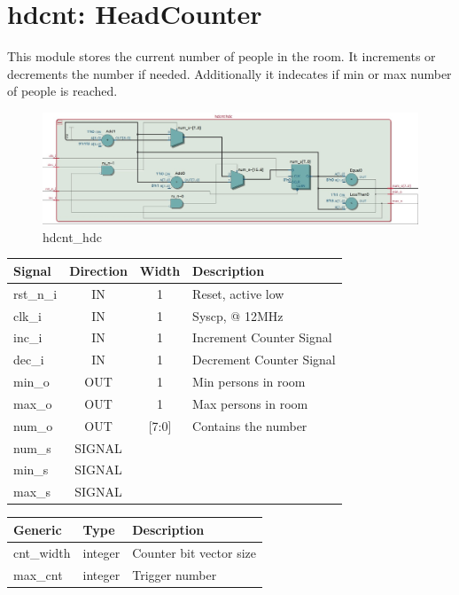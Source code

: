 \documentclass[12pt,a4 paper] {report}
\begin{document}
\newpage

\section{hdcnt: HeadCounter}
This module stores the current number of people in the room. It increments or decrements the number if needed. 
Additionally it indecates if min or max number of people is reached.
\begin{figure}[h]
	\centering	
	\includegraphics[scale=0.3]{../png/hdcnt_hdc.png}
	\caption{hdcnt\_hdc}
\end{figure}
\begin{center}
	\begin{tabular}{ | p{2cm} | c | c | p{5cm} |}
		\hline
		\textbf{Signal} & \textbf{Direction} & \textbf{Width} & \textbf{Description} \\
		\hline	
		rst\_n\_i & IN & 1 & Reset, active low \\
		\hline
		clk\_i & IN & 1 & Syscp, @ 12MHz \\
		\hline
		inc\_i & IN & 1 & Increment Counter Signal \\
		\hline
		dec\_i & IN & 1 & Decrement Counter Signal \\
		\hline
		min\_o & OUT & 1 & Min persons in room \\
		\hline
		max\_o & OUT & 1 & Max persons in room \\
		\hline
		num\_o & OUT & [7:0] & Contains the number \\
		\hline
		\hline
		num\_s & SIGNAL & & \\
		\hline
		min\_s & SIGNAL & & \\
		\hline
		max\_s & SIGNAL & & \\
		\hline
	\end{tabular}
\end{center}
\begin{center}
	\begin{tabular}{| p{2cm} | p{2cm} | p{4cm} |}
		\hline
		\textbf{Generic} & \textbf{Type} & \textbf{Description} \\
		\hline
		cnt\_width & integer & Counter bit vector size  \\
		\hline
		max\_cnt & integer & Trigger number \\
		\hline
	\end{tabular}	
\end{center}
\end{document}
